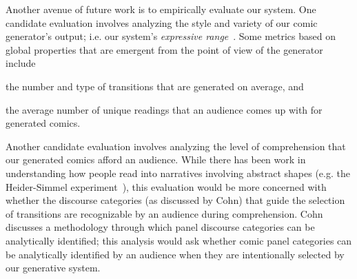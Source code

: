 

Another avenue of future work is to empirically evaluate our system.
One candidate evaluation involves analyzing the style and variety of our
comic generator's output; i.e. our system's 
\emph{expressive range}~\cite{smith2010analyzing}. Some metrics based
on global properties that are emergent from the point of view of the
generator include\begin{inparaenum}[(a)]
	\item the number and type of transitions that are generated on average, and
	\item the average number of unique readings that an audience comes up
with for generated comics.
\end{inparaenum}
%
%
Another candidate evaluation involves analyzing the level of comprehension
that our generated comics afford an audience. While there has been work in
understanding how people read into narratives involving abstract
shapes (e.g. the Heider-Simmel experiment~\cite{heider1944experimental}),
this evaluation would be more concerned with whether the discourse
categories (as discussed by Cohn) that guide the selection of transitions
are recognizable by an audience during comprehension.
Cohn~\cite{cohn2015narrative} discusses a methodology through which panel
discourse categories can be analytically identified; this analysis would
ask whether comic panel categories can be analytically identified by an
audience when they are intentionally selected by our generative system.




